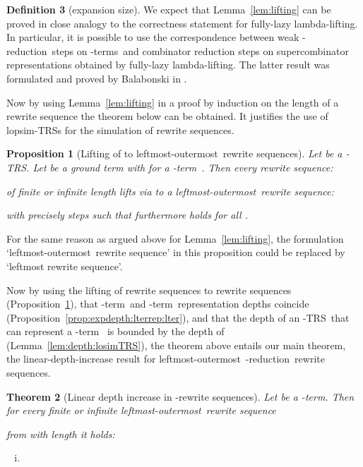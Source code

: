 \documentclass[
submission
]{dmtcs-episciences-tampered}
\newcommand{\nb}{\nobreakdash}
\newcommand{\TRS}{TRS}
\newcommand{\lopsimTRS}{lopsim-TRS}
\newcommand{\lambdaterm}{\nb-term}
\newcommand{\lambdaterms}{\lambdaterm{s}}
\newcommand{\lambdalifting}{lambda-lif\-ting}
\newcommand{\betareduction}{\nb-re\-duc\-tion}
\newcommand{\lo}{left\-most-outer\-most}
\newcommand{\lTRS}{\hspace*{-0.5pt}\nb-\hspace*{-0.5pt}\TRS}
\theoremstyle{plain}
\newtheorem{theorem}{Theorem}
\newtheorem{proposition}[theorem]{Proposition}
\theoremstyle{definition}
\newtheorem{definition}[theorem]{Definition}
\begin{document}
\begin{definition}[expansion size]
{We expect that Lemma~\ref{lem:lifting} can be proved in close analogy to the correctness statement for fully-lazy \lambdalifting.
In particular, it is possible to use the correspondence between weak \betareduction\ steps on \lambdaterms\
and combinator reduction steps on supercombinator representations obtained by fully-lazy \lambdalifting. 
The latter result was formulated and proved by Balabonski in \cite{bala:2012}.

Now by using Lemma~\ref{lem:lifting} in a proof by induction on the length of a  rewrite sequence 
the theorem below can be obtained. It justifies the use of \lopsimTRS{s} for the simulation of 
 rewrite sequences.

\begin{proposition}[Lifting of  to \lo\  rewrite sequences]\label{prop:lifting:lobeta:lo-losim:rewseqs}
  Let  be a \lTRS.
  Let  be a ground term with  for a \lambdaterm~.
  Then every  rewrite sequence:
  \begin{center}
     
  \end{center}
  of finite or infinite length  lifts via  to a \lo\  rewrite sequence: 

  with precisely   steps
  such that furthermore
   holds for all .
\end{proposition}

For the same reason as argued above for Lemma~\ref{lem:lifting}, the formulation
`\lo\  rewrite sequence' in this proposition could be replaced by `leftmost  rewrite sequence'.

Now by using the lifting of  rewrite sequences to  rewrite sequences
(Proposition~\ref{prop:lifting:lobeta:lo-losim:rewseqs}),
that \lambdaterm\ and \lambdaterm\ representation depths coincide (Proposition~\ref{prop:expdepth:lterrep:lter}),
and that the depth of an \lTRS\ that can represent a \lambdaterm~ is bounded by the depth of  (Lemma~\ref{lem:depth:losimTRS}),
the theorem above entails our main theorem,
the linear-depth-increase result for \lo\ \betareduction\ rewrite sequences.




\begin{theorem}[Linear depth increase in -rewrite sequences]\label{thm:main}
  Let  be a \lambdaterm.
  Then for every finite or infinite \lo\ rewrite sequence 
   
  from   with length 
  it holds:
  \begin{enumerate}[(i)]\setlength{\itemsep}{0ex}
    \item
      

\end{enumerate}
\end{theorem}}
\end{definition}
\end{document}
